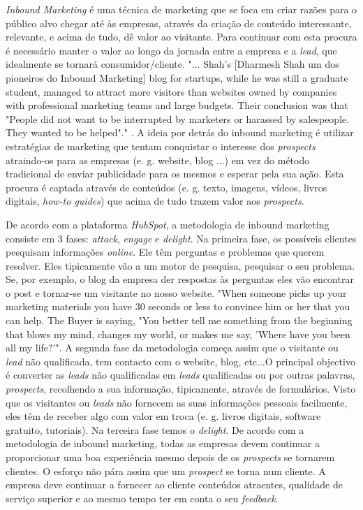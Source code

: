 \textit{Inbound Marketing} é uma técnica de marketing que se foca em criar razões para o público alvo chegar até às empresas, através da criação de conteúdo interessante, relevante, e acima de tudo, dê valor ao visitante. Para continuar com esta procura é necessário manter o valor ao longo da jornada entre a empresa e a \textit{\gls{lead}}, que idealmente se tornará consumidor/cliente. "... Shah’s [Dharmesh Shah um dos pioneiros do Inbound Marketing] blog for startups, while he was still a graduate student, managed to attract more visitors than websites owned by companies with professional marketing teams and large budgets. Their conclusion was that "People did not want to be interrupted by marketers or harassed by salespeople. They wanted to be helped"."\cite{inbound_paper} . A ideia por detrás do inbound marketing é utilizar estratégias de marketing que tentam conquistar o interesse dos \textit{\gls{prospects}} atraindo-os para as empresas (e. g. website, blog ...) em vez do método tradicional de enviar publicidade para os mesmos e esperar pela sua ação. Esta procura é captada através de conteúdos (e. g. texto, imagens, vídeos, livros digitais, \textit{how-to guides}) que acima de tudo trazem valor aos \textit{\gls{prospects}}.

De acordo com a plataforma \textit{HubSpot}\cite{HubSpot}, a metodologia de inbound marketing consiste em 3 fases: \textit{attack}, \textit{engage} e \textit{delight}. Na primeira fase, os possíveis clientes pesquisam informações \textit{online}. Ele têm perguntas e problemas que querem resolver. Eles tipicamente vão a um motor de pesquisa, pesquisar o seu problema. Se, por exemplo, o blog da empresa der respostas às perguntas eles vão encontrar o post e tornar-se um visitante no nosso website.
 "When someone picks up your marketing materials you have 30 seconds or less to convince him or her that you can help. The Buyer is saying, "You better tell me something from the beginning that blows my mind, changes my world, or makes me say, 'Where have you been all my life?'"\cite{pbr}. 
A segunda fase da metodologia começa assim que o visitante ou \textit{lead} não qualificada, tem contacto com o website, blog, etc...O principal objectivo é converter as \textit{leads} não qualificadas em \textit{leads} qualificadas ou por outras palavras, \textit{prospects}, recolhendo a sua informação, tipicamente, através de formulários. Visto que os visitantes ou \textit{leads} não fornecem as suas informações pessoais facilmente, eles têm de receber algo com valor em troca (e. g. livros digitais, software gratuito, tutoriais). 
Na terceira fase temos o \textit{delight}. De acordo com a metodologia de inbound marketing, todas as empresas devem continuar a proporcionar uma boa experiência mesmo depois de os \textit{prospects} se tornarem clientes. O esforço não pára assim que um \textit{prospect} se torna num cliente. A empresa deve continuar a fornecer ao cliente conteúdos atraentes, qualidade de serviço superior e ao mesmo tempo ter em conta o seu \textit{feedback}. 

